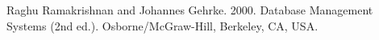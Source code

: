 \documentclass{beamer}
\begin{document}
\begin{frame}[allowframebreaks]
{\begin{thebibliography}{99}










  Raghu Ramakrishnan and Johannes Gehrke. 2000. Database Management Systems (2nd ed.). Osborne/McGraw-Hill, Berkeley, CA, USA. 

\end{thebibliography}
}
\end{frame}
\end{document}
